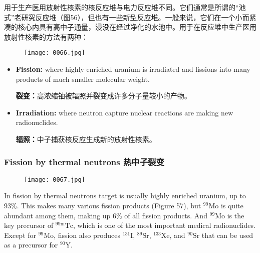 \documentclass[dvipsnames, svgnames,a4paper,11pt]{article}
\begin{document}
用于生产医用放射性核素的核反应堆与电力反应堆不同。它们通常是所谓的“池式”老研究反应堆（图56），但也有一些新型反应堆。一般来说，它们在一个小而紧凑的核心内具有高中子通量，浸没在经过净化的水池中。用于在反应堆中生产医用放射性核素的方法有两种：

\begin{figure}[ht]
    \centering
    \texttt{[image: 0066.jpg]}
     \label{fig56}
\end{figure}


\begin{itemize}
      \item \textbf{Fission:} where highly enriched uranium is irradiated and fissions into many products of much smaller molecular weight.

            \textbf{裂变：}高浓缩铀被辐照并裂变成许多分子量较小的产物。

      \item \textbf{Irradiation:} where neutron capture nuclear reactions are making new radionuclides.

            \textbf{辐照：}中子捕获核反应生成新的放射性核素。
\end{itemize}
\subsubsection{Fission by thermal neutrons  热中子裂变}

\begin{figure}[ht]
    \centering
    \texttt{[image: 0067.jpg]}
     \label{fig57}
\end{figure}


In fission by thermal neutrons target is usually highly enriched uranium, up to 93\%. This makes many various fission products (Figure 57), but ${}^\text{99}\text{Mo}$ is quite abundant among them, making up 6\% of all fission products. And ${}^\text{99}\text{Mo}$ is the key precursor of ${}^\text{99m}\text{Tc}$, which is one of the most important medical radionuclides. Except for ${}^\text{99}\text{Mo}$, fission also produces ${}^\text{131}\text{I}$, ${}^\text{89}\text{Sr}$, ${}^\text{133}\text{Xe}$, and ${}^\text{90}\text{Sr}$ that can be used as a precursor for ${}^\text{90}\text{Y}$.
\end{document}
